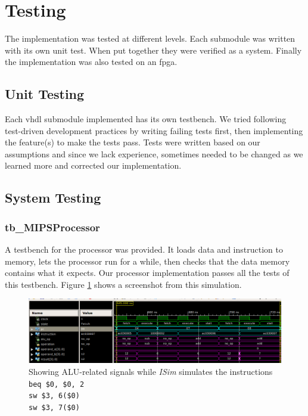 \section{Testing}
The implementation was tested at different levels.
Each submodule was written with its own unit test.
When put together they were verified as a system.
Finally the implementation was also tested on an \gls{fpga}.

\subsection{Unit Testing}
Each \gls{vhdl} submodule implemented has its own testbench.
We tried following test-driven development practices by writing failing tests first, then implementing the feature(s) to make the tests pass.
Tests were written based on our assumptions and since we lack experience,
sometimes needed to be changed as we learned more and corrected our implementation.

\subsection{System Testing}
\subsubsection{tb\_MIPSProcessor}
A testbench for the processor was provided.
It loads data and instruction to memory,
lets the processor run for a while,
then checks that the data memory contains what it expects.
Our processor implementation passes all the tests of this testbench.
Figure \ref{fig:isim} shows a screenshot from this simulation.

\begin{figure}[p]
    \centering
    \includegraphics[width=\textwidth]{img/isim}
    \caption{Showing ALU-related signals while \textit{ISim} simulates the instructions\\
        \texttt{beq \$0, \$0, 2}\\
        \texttt{sw \$3, 6(\$0)}\\
        \texttt{sw \$3, 7(\$0)}
    }
    \label{fig:isim}
\end{figure}

